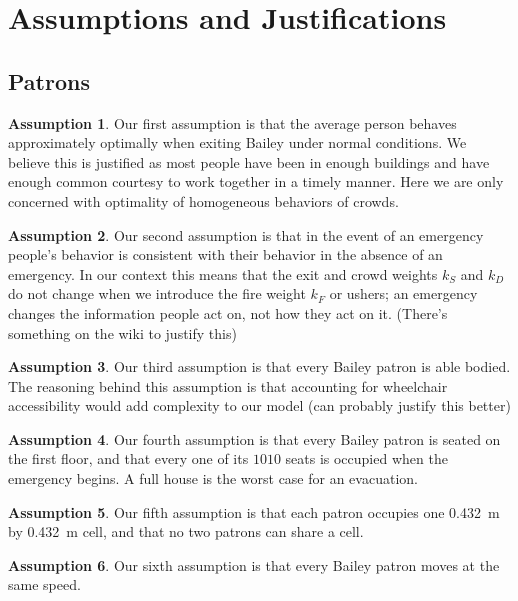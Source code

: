 \documentclass[14pt]{article}
\theoremstyle{definition}
\newtheorem{assumption}{Assumption}
\begin{document}
\section{Assumptions and Justifications}

\subsection{Patrons}
\begin{assumption}\label{as:optimal}
 Our first assumption is that the average person behaves approximately optimally when exiting Bailey under normal conditions. We believe this is justified as most people have been in enough buildings and have enough common courtesy to work together in a timely manner. Here we are only concerned with optimality of homogeneous behaviors of crowds.
\end{assumption}
\begin{assumption}\label{as:consistent}
 Our second assumption is that in the event of an emergency people's behavior is consistent with their behavior in the absence of an emergency. In our context this means that the exit and crowd weights $k_S$ and $k_D$ do not change when we introduce the fire weight $k_F$ or ushers; an emergency changes the information people act on, not how they act on it. (There's something on the wiki to justify this)
\end{assumption}
\begin{assumption}\label{as:accesibility}
  Our third assumption is that every Bailey patron is able bodied. The reasoning behind this assumption is that accounting for wheelchair accessibility would add complexity to our model (can probably justify this better)
\end{assumption}
\begin{assumption}\label{as:second}
  Our fourth assumption is that every Bailey patron is seated on the first floor, and that every one of its $1010$ seats is occupied when the emergency begins. A full house is the worst case for an evacuation.
\end{assumption}
\begin{assumption}\label{as:chairs}
  Our fifth assumption is that each patron occupies one \SI{0.432}{m} by \SI{0.432}{m} cell, and that no two patrons can share a cell.
\end{assumption}
\begin{assumption}\label{as:speed}
  Our sixth assumption is that every Bailey patron moves at the same speed.
\end{assumption}
\end{document}
